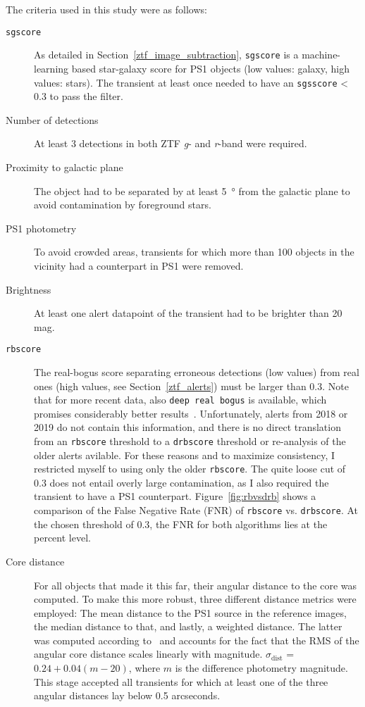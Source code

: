 The criteria used in this study were as follows:
\begin{description}
  \item[\texttt{sgscore}] As detailed in Section~\ref{ztf_image_subtraction}, \texttt{sgscore} is a machine-learning based star-galaxy score for PS1 objects (low values: galaxy, high values: stars). The transient at least once needed to have an \texttt{sgsscore} < 0.3 to pass the filter.
  \item[Number of detections] At least 3 detections in both ZTF \textit{g}- and \textit{r}-band were required.
  \item[Proximity to galactic plane] The object had to be separated by at least \SI{5}{\degree} from the galactic plane to avoid contamination by foreground stars.
  \item[PS1 photometry] To avoid crowded areas, transients for which more than 100 objects in the vicinity had a counterpart in PS1 were removed.
  \item[Brightness] At least one alert datapoint of the transient had to be brighter than 20 mag.
  \item[\texttt{rbscore}] The real-bogus score separating erroneous detections (low values) from real ones (high values, see Section~\ref{ztf_alerts}) must be larger than 0.3. Note that for more recent data, also \texttt{deep real bogus} is available, which promises considerably better results~. Unfortunately, alerts from 2018 or 2019 do not contain this information, and there is no direct translation from an \texttt{rbscore} threshold to a \texttt{drbscore} threshold or re-analysis of the older alerts avilable. For these reasons and to maximize consistency, I restricted myself to using only the older \texttt{rbscore}. The quite loose cut of 0.3 does not entail overly large contamination, as I also required the transient to have a PS1 counterpart. Figure~\ref{fig:rbvsdrb} shows a comparison of the False Negative Rate (FNR) of \texttt{rbscore} vs. \texttt{drbscore}. At the chosen threshold of $0.3$, the FNR for both algorithms lies at the percent level.
  \item[Core distance] For all objects that made it this far, their angular distance to the core was computed. To make this more robust, three different distance metrics were employed: The mean distance to the PS1 source in the reference images, the median distance to that, and lastly, a weighted distance. The latter was computed according to~ and accounts for the fact that the RMS of the angular core distance scales linearly with magnitude. $\sigma_\text{dist}$ = $0.24 + 0.04(m-20)$, where $m$ is the difference photometry magnitude. This stage accepted all transients for which at least one of the three angular distances lay below 0.5 arcseconds.
\end{description}

